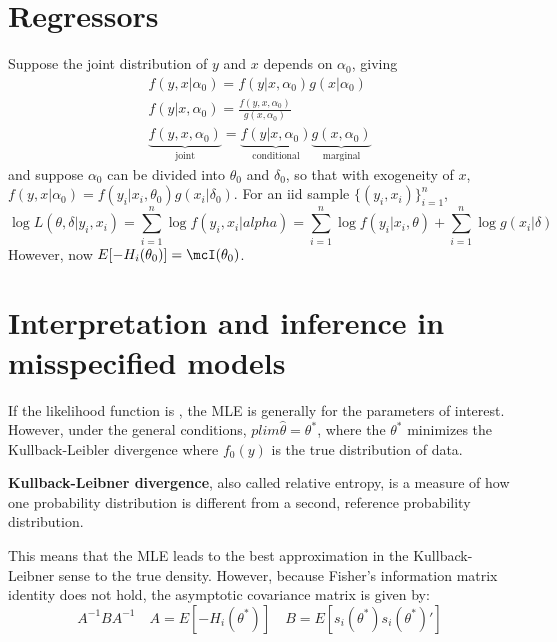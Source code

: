 \section{Regressors}
Suppose the joint distribution of $y$ and $x$ depends on $\alpha_0$, giving
\begin{gather}
    f(y,x|\alpha_0) = f(y|x,\alpha_0)g(x|\alpha_0)\\
    f(y|x,\alpha_0) = \frac{f(y,x,\alpha_0)}{g(x,\alpha_0)}\\
    \underbrace{f(y,x,\alpha_0)}_{\text{joint}} = \underbrace{f(y|x,\alpha_0)}_{\text{conditional}}\underbrace{g(x,\alpha_0)}_{\text{marginal}}
\end{gather}
and suppose $\alpha_0$ can be divided into $\theta_0$ and $\delta_0$, so that with exogeneity of $x$, 
$f(y,x|\alpha_0) = f(y_i|x_i,\theta_0)g(x_i|\delta_0)$.
For an iid sample $\{(y_i,x_i)\}_{i=1}^{n}$,
\begin{equation}
    \log L(\theta,\delta|y_i,x_i) = \sum_{i=1}^{n}\log f(y_i,x_i|alpha) 
    = \sum_{i=1}^{n}\log f(y_i|x_i,\theta) + \sum_{i=1}^{n}\log g(x_i|\delta)
\end{equation}
However, now $E[-H_i(\theta_0)] = \mcI(\theta_0)$.

\section{Interpretation and inference in misspecified models}
If the likelihood function is , 
the MLE is generally  for the parameters of interest.
However, under the general conditions, $plim\hat{\theta} = \theta^*$, 
where the  $\theta^*$ minimizes the Kullback-Leibler divergence
where $f_0(y)$ is the true distribution of data.
\begin{definition}
    \textbf{Kullback-Leibner divergence}, also called relative entropy, 
    is a measure of how one probability distribution is different from a second,
    reference probability distribution.
\end{definition}
This means that the MLE leads to the best approximation in the Kullback-Leibner sense
to the true density. However, because Fisher's information matrix identity does not hold,
the asymptotic covariance matrix is given by:
\begin{equation}
    A^{-1}BA^{-1}\quad A = E[-H_i(\theta^*)]\quad B = E[s_i(\theta^*)s_i(\theta^*)']
\end{equation}

